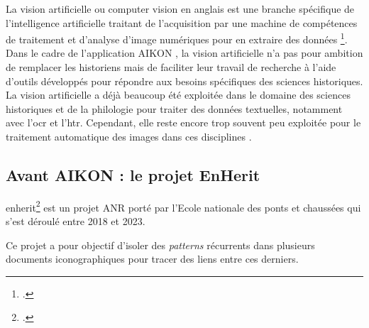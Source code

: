 	La vision artificielle ou computer vision  en anglais est \og une branche spécifique de l'intelligence artificielle traitant de l'acquisition par une machine de compétences de traitement et d'analyse d'image numériques pour en extraire des données \fg \footcite{norindrTraitementSourcesHistoriques2023}.
	Dans le cadre de l'application AIKON , la vision artificielle n'a pas pour ambition de remplacer les historiens  mais de faciliter leur travail de recherche à l'aide d'outils développés pour répondre aux besoins spécifiques des sciences historiques. 
	La vision artificielle a déjà beaucoup été exploitée dans le domaine des sciences historiques et de la philologie pour traiter des données textuelles, notamment avec l'\gls{ocr} et l'\gls{htr}. Cependant, elle reste encore trop souvent peu exploitée pour le traitement automatique des images dans ces disciplines .

\subsection{Avant AIKON : le projet EnHerit}

\gls{enherit}\footcite{EnHeritEnhancingHeritage} est un projet ANR porté par l'Ecole nationale des ponts et chaussées qui s'est déroulé entre 2018 et 2023.

Ce projet a pour objectif d'isoler des \textit{patterns}  récurrents dans plusieurs documents iconographiques pour tracer des liens entre ces derniers.

